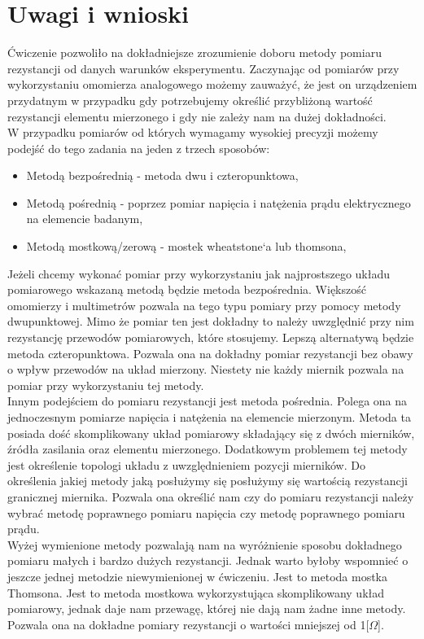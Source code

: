 \documentclass[11pt]{article}
\begin{document}
    \section{Uwagi i wnioski}
    Ćwiczenie pozwoliło na dokładniejsze zrozumienie doboru metody pomiaru rezystancji od danych warunków eksperymentu.
    Zaczynając od pomiarów przy wykorzystaniu omomierza analogowego możemy zauważyć, że jest on urządzeniem przydatnym w przypadku
    gdy potrzebujemy określić przybliżoną wartość rezystancji elementu mierzonego i gdy nie zależy nam na dużej dokładności.\\
    \indent W przypadku pomiarów od których wymagamy wysokiej precyzji możemy podejść do tego zadania na jeden z trzech sposobów:
    \begin{itemize}
        \setlength\itemsep{0em}
        \item Metodą bezpośrednią - metoda dwu i czteropunktowa,
        \item Metodą pośrednią - poprzez pomiar napięcia i natężenia prądu elektrycznego na elemencie badanym,
        \item Metodą mostkową/zerową - mostek wheatstone`a lub thomsona,
    \end{itemize}
    \par Jeżeli chcemy wykonać pomiar przy wykorzystaniu jak najprostszego układu pomiarowego wskazaną metodą będzie metoda bezpośrednia.
    Większość omomierzy i multimetrów pozwala na tego typu pomiary przy pomocy metody dwupunktowej. Mimo że pomiar ten jest dokładny
    to należy uwzględnić przy nim rezystancję przewodów pomiarowych, które stosujemy. Lepszą alternatywą będzie metoda czteropunktowa.
    Pozwala ona na dokładny pomiar rezystancji bez obawy o wpływ przewodów na układ mierzony. Niestety nie każdy miernik pozwala
    na pomiar przy wykorzystaniu tej metody.\\
    \indent Innym podejściem do pomiaru rezystancji jest metoda pośrednia. Polega ona na jednoczesnym pomiarze napięcia i natężenia na elemencie
    mierzonym. Metoda ta posiada dość skomplikowany układ pomiarowy składający się z dwóch mierników, źródła zasilania oraz elementu mierzonego.
    Dodatkowym problemem tej metody jest określenie topologi układu z uwzględnieniem pozycji mierników. Do określenia jakiej metody
    jaką posłużymy się posłużymy się wartością rezystancji granicznej miernika. Pozwala ona określić nam czy do pomiaru rezystancji należy
    wybrać metodę poprawnego pomiaru napięcia czy metodę poprawnego pomiaru prądu.\\
    \indent Wyżej wymienione metody pozwalają nam na wyróżnienie sposobu dokładnego pomiaru małych i bardzo dużych rezystancji. Jednak warto byłoby
    wspomnieć o jeszcze jednej metodzie niewymienionej w ćwiczeniu. Jest to metoda mostka Thomsona. Jest to metoda mostkowa wykorzystująca
    skomplikowany układ pomiarowy, jednak daje nam przewagę, której nie dają nam żadne inne metody. Pozwala ona na dokładne pomiary rezystancji
    o wartości mniejszej od 1[$\Omega$].
    \newpage
\end{document}
